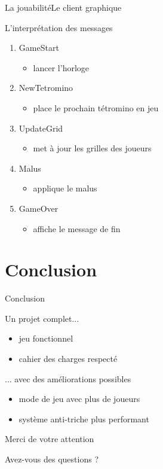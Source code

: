 \documentclass[french]{beamer}
\begin{document}
		\begin{frame}{La jouabilité}{Le client graphique}
			\begin{block}{L'interprétation des messages}				
				\begin{enumerate}
					\item GameStart
				    	\begin{itemize}
				    		\item lancer l'horloge
				    	\end{itemize}
				   	
				   	\item NewTetromino
				   		\begin{itemize}
				   			\item place le prochain tétromino en jeu
				   		\end{itemize}

					\item UpdateGrid
				    	\begin{itemize}
				    		\item met à jour les grilles des joueurs
				    	\end{itemize}

				    \item Malus
				    	\begin{itemize}
				    		\item applique le malus
				    	\end{itemize}

					\item GameOver
				    	\begin{itemize}
				    		\item affiche le message de fin
				    	\end{itemize}
				\end{enumerate}
			\end{block}
		\end{frame}

\section*{Conclusion}

		\begin{frame}{Conclusion}
			\begin{block}{Un projet complet...}
				\begin{itemize}
					\item jeu fonctionnel
					\item cahier des charges respecté
				\end{itemize}
			\end{block}

			\begin{block}{... avec des améliorations possibles}
				\begin{itemize}
					\item mode de jeu avec plus de joueurs
					\item système anti-triche plus performant
				\end{itemize}
			\end{block}
		\end{frame}

		\begin{frame}{Merci de votre attention}
			\begin{center}
				\Large{Avez-vous des questions ?}
			\end{center}
		\end{frame}




	
\end{document}
